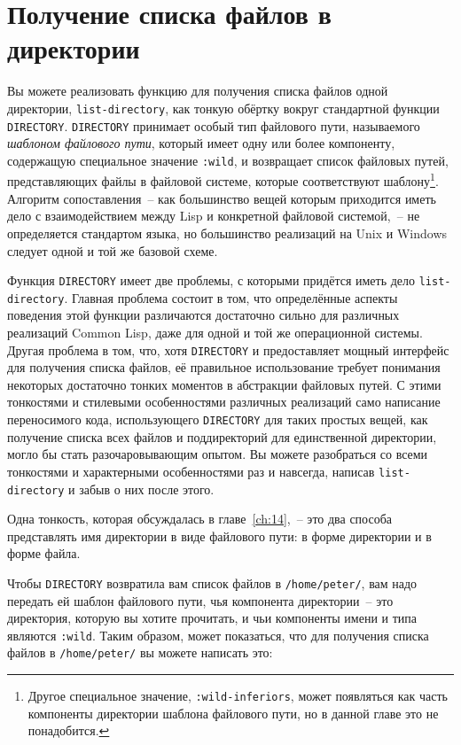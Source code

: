 \section{Получение списка файлов в директории}

Вы можете реализовать функцию для получения списка файлов одной директории,
\lstinline{list-directory}, как тонкую обёртку вокруг стандартной функции
\lstinline{DIRECTORY}. \lstinline{DIRECTORY} принимает особый тип файлового пути,
называемого \textit{шаблоном файлового пути}, который имеет одну или более компоненту,
содержащую специальное значение \lstinline{:wild}, и возвращает список файловых путей,
представляющих файлы в файловой системе, которые соответствуют шаблону\footnote{Другое
  специальное значение, \lstinline{:wild-inferiors}, может появляться как часть компоненты
  директории шаблона файлового пути, но в данной главе это не понадобится.}. Алгоритм
сопоставления~-- как большинство вещей которым приходится иметь дело с взаимодействием
между Lisp и конкретной файловой системой,~-- не определяется стандартом языка, но
большинство реализаций на Unix и Windows следует одной и той же базовой схеме.

Функция \lstinline{DIRECTORY} имеет две проблемы, с которыми придётся иметь дело
\lstinline{list-directory}. Главная проблема состоит в том, что определённые аспекты поведения
этой функции различаются достаточно сильно для различных реализаций Common Lisp, даже для
одной и той же операционной системы. Другая проблема в том, что, хотя \lstinline{DIRECTORY} и
предоставляет мощный интерфейс для получения списка файлов, её правильное использование
требует понимания некоторых достаточно тонких моментов в абстракции файловых путей. С
этими тонкостями и стилевыми особенностями различных реализаций само написание
переносимого кода, использующего \lstinline{DIRECTORY} для таких простых вещей, как получение
списка всех файлов и поддиректорий для единственной директории, могло бы стать
разочаровывающим опытом. Вы можете разобраться со всеми тонкостями и характерными
особенностями раз и навсегда, написав \lstinline{list-directory} и забыв о них после этого.

Одна тонкость, которая обсуждалась в главе~\ref{ch:14},~-- это два способа представлять
имя директории в виде файлового пути: в форме директории и в форме файла.

Чтобы \lstinline{DIRECTORY} возвратила вам список файлов в \lstinline{/home/peter/}, вам надо
передать ей шаблон файлового пути, чья компонента директории~-- это директория, которую
вы хотите прочитать, и чьи компоненты имени и типа являются \lstinline{:wild}. Таким образом,
может показаться, что для получения списка файлов в \lstinline{/home/peter/} вы можете написать
это:

